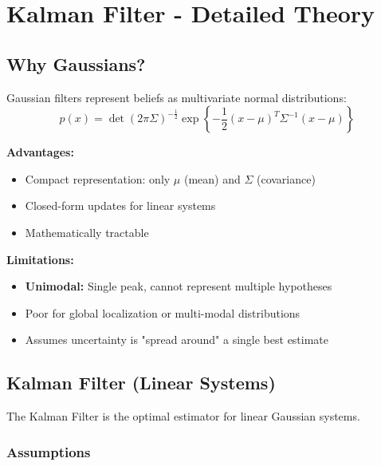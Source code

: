 \section{Kalman Filter - Detailed Theory}

\subsection{Why Gaussians?}

Gaussian filters represent beliefs as multivariate normal distributions:
\begin{equation}
p(x) = \det(2\pi\Sigma)^{-\frac{1}{2}} \exp\left\{-\frac{1}{2}(x-\mu)^{T}\Sigma^{-1}(x-\mu)\right\}
\end{equation}

\textbf{Advantages:}
\begin{itemize}
    \item Compact representation: only $\mu$ (mean) and $\Sigma$ (covariance)
    \item Closed-form updates for linear systems
    \item Mathematically tractable
\end{itemize}

\textbf{Limitations:}
\begin{itemize}
    \item \textbf{Unimodal:} Single peak, cannot represent multiple hypotheses
    \item Poor for global localization or multi-modal distributions
    \item Assumes uncertainty is "spread around" a single best estimate
\end{itemize}

\subsection{Kalman Filter (Linear Systems)}

The Kalman Filter is the optimal estimator for linear Gaussian systems.

\subsubsection{Assumptions}

